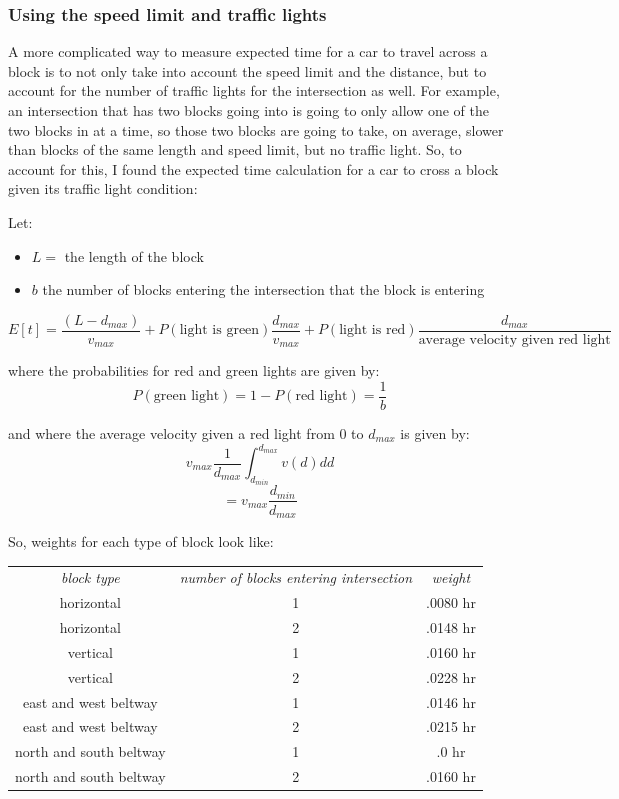 \documentclass{article}
\begin{document}
\subsubsection{Using the speed limit and traffic lights}
A more complicated way to measure expected time for a car to travel across a block is to not only take into account the speed limit and the distance, but to account for the number of traffic lights for the intersection as well. For example, an intersection that has two blocks going into is going to only allow one of the two blocks in at a time, so those two blocks are going to take, on average, slower than blocks of the same length and speed limit, but no traffic light. So, to account for this, I found the expected time calculation for a car to cross a block given its traffic light condition:

Let:
\begin{itemize}
	\item $L =$ the length of the block
	\item $b$ the number of blocks entering the intersection that the block is entering 
\end{itemize}

\[ E[t] = \dfrac{(L - d_{max})}{v_{max}} + P(\text{light is green})\dfrac{d_{max}}{v_{max}} + P(\text{light is red})\dfrac{d_{max}}{\text{average velocity given red light}}\]

where the probabilities for red and green lights are given by:
\[P(\text{green light}) = 1 - P(\text{red light}) = \dfrac{1}{b}\]

and where the average velocity given a red light from 0 to $d_{max}$ is given by:
\[v_{max}\dfrac{1}{d_{max}} \int_{d_{min}}^{d_{max}} v(d) dd\]
\[= v_{max}\dfrac{d_{min}}{d_{max}}\]

So, weights for each type of block look like:
\begin{center}
\begin{tabular}{ |c|c|c| } 
 \hline
 \textit{block type} & \textit{number of blocks entering intersection}  & \textit{weight}\\ 
 horizontal & 1 & .0080 hr\\
 horizontal & 2 & .0148 hr\\ 
 vertical & 1 & .0160 hr\\
 vertical & 2 & .0228 hr\\
 east and west beltway & 1 & .0146 hr\\
 east and west beltway & 2 & .0215 hr\\
 north and south beltway & 1 & .0 hr\\
 north and south beltway & 2 & .0160 hr\\
 \hline
\end{tabular}
\end{center}
\end{document}
